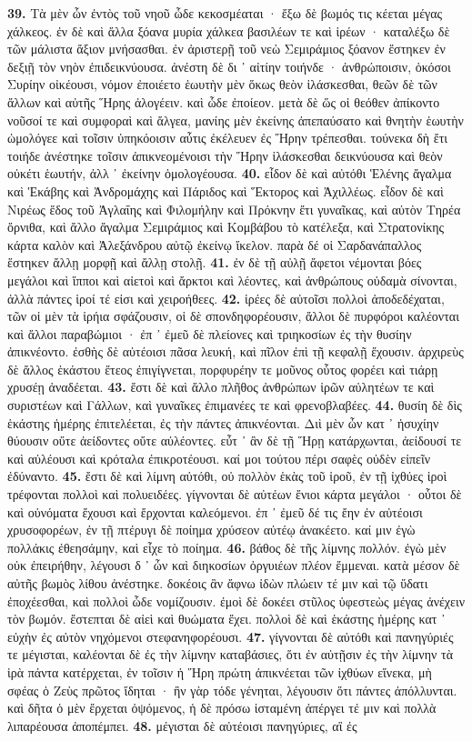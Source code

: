 \documentclass[a4paper, 11pt, oneside, polutonikogreek, german]{article}
\begin{document}
\textbf{39.} Τὰ μὲν ὦν ἐντὸς τοῦ νηοῦ ὧδε κεκοσμέαται · ἔξω δὲ βωμός τις κέεται μέγας χάλκεος. ἐν δὲ καὶ ἄλλα ξόανα μυρία χάλκεα βασιλέων τε καὶ ἱρέων · καταλέξω δὲ τῶν μάλιστα ἄξιον μνήσασθαι. ἐν ἀριστερῇ τοῦ νεὼ Σεμιράμιος ξόανον ἕστηκεν ἐν δεξιῇ τὸν νηὸν ἐπιδεικνύουσα. ἀνέστη δὲ δι ᾽ αἰτίην τοιήνδε · ἀνθρώποισιν, ὁκόσοι Συρίην οἰκέουσι, νόμον ἐποιέετο ἑωυτὴν μὲν ὅκως θεὸν ἱλάσκεσθαι, θεῶν δὲ τῶν ἄλλων καὶ αὐτῆς Ἥρης ἀλογέειν. καὶ ὧδε ἐποίεον. μετὰ δὲ ὥς οἱ θεόθεν ἀπίκοντο νοῦσοί τε καὶ συμφοραὶ καὶ ἄλγεα, μανίης μὲν ἐκείνης ἀπεπαύσατο καὶ θνητὴν ἑωυτὴν ὡμολόγεε καὶ τοῖσιν ὑπηκόοισιν αὖτις ἐκέλευεν ἐς Ἥρην τρέπεσθαι. τούνεκα δὴ ἔτι τοιήδε ἀνέστηκε τοῖσιν ἀπικνεομένοισι τὴν Ἥρην ἱλάσκεσθαι δεικνύουσα καὶ θεὸν οὐκέτι ἑωυτήν, ἀλλ ᾽ ἐκείνην ὁμολογέουσα. \textbf{40.} εἶδον δὲ καὶ αὐτόθι Ἑλένης ἄγαλμα καὶ Ἑκάβης καὶ Ἀνδρομάχης καὶ Πάριδος καὶ Ἕκτορος καὶ Ἀχιλλέως. εἶδον δὲ καὶ Νιρέως ἕδος τοῦ Ἀγλαΐης καὶ Φιλομήλην καὶ Πρόκνην ἔτι γυναῖκας, καὶ αὐτὸν Τηρέα ὄρνιθα, καὶ ἄλλο ἄγαλμα Σεμιράμιος καὶ Κομβάβου τὸ κατέλεξα, καὶ Στρατονίκης κάρτα καλὸν καὶ Ἀλεξάνδρου αὐτῷ ἐκείνῳ ἴκελον. παρὰ δέ οἱ Σαρδανάπαλλος ἕστηκεν ἄλλῃ μορφῇ καὶ ἄλλῃ στολῇ. \textbf{41.} ἐν δὲ τῇ αὐλῇ ἄφετοι νέμονται βόες μεγάλοι καὶ ἵπποι καὶ αἰετοὶ καὶ ἄρκτοι καὶ λέοντες, καὶ ἀνθρώπους οὐδαμὰ σίνονται, ἀλλὰ πάντες ἱροί τέ εἰσι καὶ χειροήθεες. \textbf{42.} ἱρέες δὲ αὐτοῖσι πολλοὶ ἀποδεδέχαται, τῶν οἱ μὲν τὰ ἱρήια σφάζουσιν, οἱ δὲ σπονδηφορέουσιν, ἄλλοι δὲ πυρφόροι καλέονται καὶ ἄλλοι παραβώμιοι · ἐπ ᾽ ἐμεῦ δὲ πλείονες καὶ τριηκοσίων ἐς τὴν θυσίην ἀπικνέοντο. ἐσθὴς δὲ αὐτέοισι πᾶσα λευκή, καὶ πῖλον ἐπὶ τῇ κεφαλῇ ἔχουσιν. ἀρχιρεὺς δὲ ἄλλος ἑκάστου ἔτεος ἐπιγίγνεται, πορφυρέην τε μοῦνος οὗτος φορέει καὶ τιάρῃ χρυσέῃ ἀναδέεται. \textbf{43.} ἔστι δὲ καὶ ἄλλο πλῆθος ἀνθρώπων ἱρῶν αὐλητέων τε καὶ συριστέων καὶ Γάλλων, καὶ γυναῖκες ἐπιμανέες τε καὶ φρενοβλαβέες. \textbf{44.} θυσίη δὲ δὶς ἑκάστης ἡμέρης ἐπιτελέεται, ἐς τὴν πάντες ἀπικνέονται. Διὶ μὲν ὦν κατ ᾽ ἡσυχίην θύουσιν οὔτε ἀείδοντες οὔτε αὐλέοντες. εὖτ ᾽ ἂν δὲ τῇ Ἥρῃ κατάρχωνται, ἀείδουσί τε καὶ αὐλέουσι καὶ κρόταλα ἐπικροτέουσι. καί μοι τούτου πέρι σαφὲς οὐδὲν εἰπεῖν ἐδύναντο. \textbf{45.} ἔστι δὲ καὶ λίμνη αὐτόθι, οὐ πολλὸν ἑκὰς τοῦ ἱροῦ, ἐν τῇ ἰχθύες ἱροὶ τρέφονται πολλοὶ καὶ πολυειδέες. γίγνονται δὲ αὐτέων ἔνιοι κάρτα μεγάλοι · οὗτοι δὲ καὶ οὐνόματα ἔχουσι καὶ ἔρχονται καλεόμενοι. ἐπ ᾽ ἐμεῦ δέ τις ἔην ἐν αὐτέοισι χρυσοφορέων, ἐν τῇ πτέρυγι δὲ ποίημα χρύσεον αὐτέῳ ἀνακέετο. καί μιν ἐγὼ πολλάκις ἐθεησάμην, καὶ εἶχε τὸ ποίημα. \textbf{46.} βάθος δὲ τῆς λίμνης πολλόν. ἐγὼ μὲν οὐκ ἐπειρήθην, λέγουσι δ ᾽ ὦν καὶ διηκοσίων ὀργυιέων πλέον ἔμμεναι. κατὰ μέσον δὲ αὐτῆς βωμὸς λίθου ἀνέστηκε. δοκέοις ἂν ἄφνω ἰδὼν πλώειν τέ μιν καὶ τῷ ὕδατι ἐποχέεσθαι, καὶ πολλοὶ ὧδε νομίζουσιν. ἐμοὶ δὲ δοκέει στῦλος ὑφεστεὼς μέγας ἀνέχειν τὸν βωμόν. ἔστεπται δὲ αἰεὶ καὶ θυώματα ἔχει. πολλοὶ δὲ καὶ ἑκάστης ἡμέρης κατ ᾽ εὐχὴν ἐς αὐτὸν νηχόμενοι στεφανηφορέουσι. \textbf{47.} γίγνονται δὲ αὐτόθι καὶ πανηγύριές τε μέγισται, καλέονται δὲ ἐς τὴν λίμνην καταβάσιες, ὅτι ἐν αὐτῇσιν ἐς τὴν λίμνην τὰ ἱρὰ πάντα κατέρχεται, ἐν τοῖσιν ἡ Ἥρη πρώτη ἀπικνέεται τῶν ἰχθύων εἵνεκα, μὴ σφέας ὁ Ζεὺς πρῶτος ἴδηται · ἢν γὰρ τόδε γένηται, λέγουσιν ὅτι πάντες ἀπόλλυνται. καὶ δῆτα ὁ μὲν ἔρχεται ὀψόμενος, ἡ δὲ πρόσω ἱσταμένη ἀπέργει τέ μιν καὶ πολλὰ λιπαρέουσα ἀποπέμπει. \textbf{48.} μέγισται δὲ αὐτέοισι πανηγύριες, αἳ ἐς 
\end{document}
